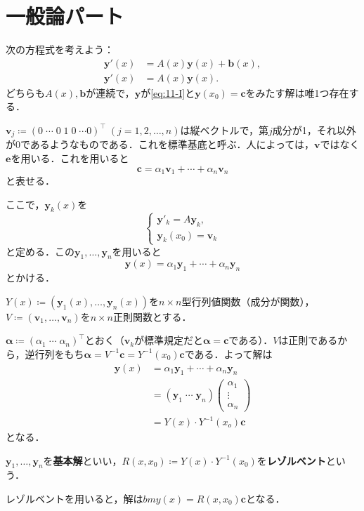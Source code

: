 \section{一般論パート}
次の方程式を考えよう：
\begin{align}
    \bm{y}'(x) &= A(x)\bm{y}(x) + \bm{b}(x), \label{eq:11-I} \\
    \bm{y}'(x) &= A(x)\bm{y}(x). \label{eq:11-H}
\end{align}
どちらも$A(x),\bm{b}$が連続で，$\bm{y}$が\eqref{eq:11-I}と$\bm{y}(x_0)=\bm{c}$をみたす解は唯1つ存在する．

$\bm{v}_j \coloneqq (0 \; \cdots \; 0 \; 1 \; 0 \; \cdots 0)^\top \; (j=1,2,\ldots,n)$は縦ベクトルで，第$j$成分が1，それ以外が0であるようなものである．これを標準基底と呼ぶ．人によっては，$\bm{v}$ではなく$\bm{e}$を用いる．これを用いると
\[ \bm{c} = \alpha_1\bm{v}_1 + \cdots + \alpha_n\bm{v}_n\]
と表せる．

ここで，$\bm{y}_k(x)$を
\[ \begin{cases}
    \bm{y}'_k = A\bm{y}_k, \\
    \bm{y}_k(x_0) = \bm{v}_k
\end{cases}\]
と定める．この$\bm{y}_1,\ldots,\bm{y}_n$を用いると
\[ \bm{y}(x) = \alpha_1\bm{y}_1 + \cdots + \alpha_n\bm{y}_n\]
とかける．

$Y(x) \coloneqq (\bm{y}_1(x),\ldots,\bm{y}_n(x))$を$n\times n$型行列値関数（成分が関数），$V \coloneqq (\bm{v}_1,\ldots,\bm{v}_n)$を$n\times n$正則関数とする．

$\bm{\alpha} \coloneqq (\alpha_1 \; \cdots \; \alpha_n)^\top$とおく（$\bm{v}_k$が標準規定だと$\bm{\alpha}=\bm{c}$である）．$V$は正則であるから，逆行列をもち$\bm{\alpha}= V^{-1}\bm{c}=Y^{-1}(x_0)\bm{c}$である．よって解は
\begin{align*}
    \bm{y}(x) &= \alpha_1\bm{y}_1 + \cdots + \alpha_n\bm{y}_n \\
    &= (\bm{y}_1 \; \cdots \; \bm{y}_n)
    \begin{pmatrix}
        \alpha_1 \\ \vdots \\ \alpha_n
    \end{pmatrix} \\
    &= Y(x)\cdot Y^{-1}(x_o)\bm{c}
\end{align*}
となる．

\begin{definition}
    $\bm{y}_1,\ldots,\bm{y}_n$を\textbf{基本解}といい，$R(x,x_0) \coloneqq Y(x)\cdot Y^{-1}(x_0)$を\textbf{レゾルベント}という．
\end{definition}
レゾルベントを用いると，解は$bm{y}(x) = R(x,x_0)\bm{c}$となる．

